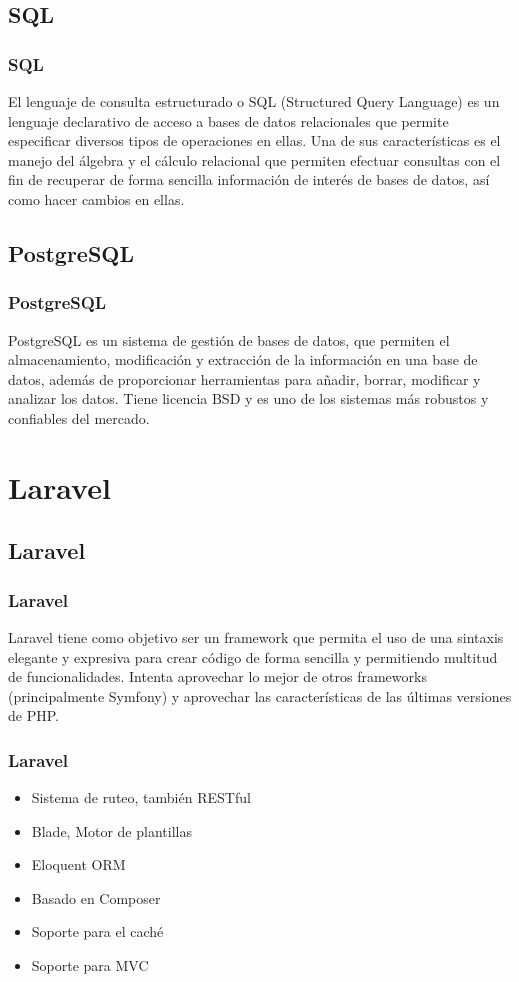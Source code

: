 \documentclass[12pt]{beamer}
\begin{document}
\subsection{SQL}

\begin{frame}
 \frametitle{SQL}
 El lenguaje de consulta estructurado o SQL (Structured Query Language) es un lenguaje declarativo de acceso a bases de datos relacionales que permite especificar diversos tipos de operaciones en ellas. Una de sus características es el manejo del álgebra y el cálculo relacional que permiten efectuar consultas con el fin de recuperar de forma sencilla información de interés de bases de datos, así como hacer cambios en ellas.
\end{frame}

\subsection{PostgreSQL}

\begin{frame}
 \frametitle{PostgreSQL}
 PostgreSQL es un sistema de gestión de bases de datos, que permiten el almacenamiento, modificación y extracción de la información en una base de datos, además de proporcionar herramientas para añadir, borrar, modificar y analizar los datos. Tiene licencia BSD y es uno de los sistemas más robustos y confiables del mercado.
\end{frame}


\section{Laravel}

\subsection{Laravel}

\begin{frame}
 \frametitle{Laravel}
 Laravel tiene como objetivo ser un framework que permita el uso de una sintaxis elegante y expresiva para crear código de forma sencilla y permitiendo multitud de funcionalidades. Intenta aprovechar lo mejor de otros frameworks (principalmente Symfony) y aprovechar las características de las últimas versiones de PHP.
\end{frame}


\begin{frame}
 \frametitle{Laravel}
 \begin{itemize}
  \item Sistema de ruteo, también RESTful
  \item Blade, Motor de plantillas
  \item Eloquent ORM
  \item Basado en Composer
  \item Soporte para el caché
  \item Soporte para MVC
 \end{itemize}
\end{frame}
\end{document}
